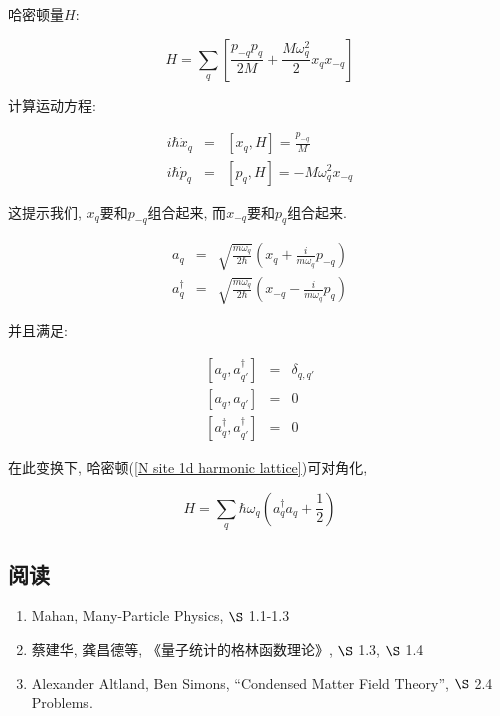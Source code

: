 哈密顿量$H$:

\begin{equation}\label{N site 1d harmonic lattice}
H = \sum_q \left[ \frac{p_{-q} p_{q}}{2M} + \frac{M\omega_q^2}{2}
x_q x_{-q} \right]
\end{equation}

计算运动方程:

\begin{eqnarray*}
i\hbar \dot x_q &=& [x_q, H] = \frac{p_{-q}}{M} \\
i \hbar \dot p_q &=& [p_q, H]= - M \omega_q^2 x_{-q}
\end{eqnarray*}

这提示我们, $x_q$要和$p_{-q}$组合起来, 而$x_{-q}$要和$p_q$组合起来.

\begin{eqnarray*}
a_q &=& \sqrt{\frac{m \omega_q}{2\hbar}} \left(x_q +\frac{i}{m \omega_q} p_{-q} \right) \\
a_q^{\dagger} &=& \sqrt{\frac{m \omega_q}{2\hbar}} \left(x_{-q} - \frac{i}{m \omega_q} p_q \right)
\end{eqnarray*}

并且满足:

\begin{eqnarray*}
  \left[a_q , a_{q'}^\dagger \right] &=& \delta_{q,q'} \\
  \left[a_q, a_{q'}\right] &=& 0 \\
  \left[a_q^\dagger , a_{q'}^\dagger \right] &=& 0
\end{eqnarray*}

在此变换下, 哈密顿(\ref{N site 1d harmonic lattice})可对角化,

\begin{equation*}
H = \sum_q \hbar \omega_q \left( a_q^\dagger a_q + \frac{1}{2} \right)
\end{equation*}




\subsection*{阅读}

\begin{enumerate}

  \item Mahan, Many-Particle Physics, $\S$ 1.1-1.3

  \item 蔡建华, 龚昌德等, 《量子统计的格林函数理论》, $\S$ 1.3, $\S$  1.4

  \item Alexander Altland, Ben Simons, ``Condensed Matter Field Theory'', $\S$ 2.4 Problems.

\end{enumerate}
